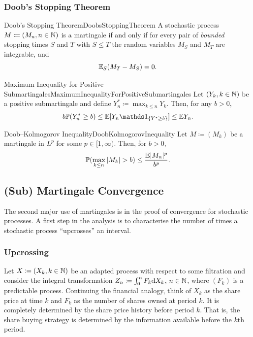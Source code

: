 \subsubsection{Doob's Stopping Theorem}
\begin{thm}{Doob's Stopping Theorem}{DoobsStoppingTheorem}
	A stochastic process $M \coloneqq (M_n, n \in \mathbb{N})$ is a martingale if and only if for every pair of \emph{bounded} stopping times $S$ and $T$ with $S \le T$ the random variables $M_S$ and $M_T$ are integrable, and
	\begin{equation}\label{eq:DoobsStoppingEquality}
		\mathbb{E}_S(M_T - M_S) = 0.
	\end{equation}
\end{thm}

\begin{lem}{Maximum Inequality for Positive Submartingales}{MaximumInequalityForPositiveSubmartingales}
	Let $(Y_k, k \in \mathbb{N})$ be a positive submartingale and define $Y_n^* \coloneqq \max_{k \le n} Y_k$. Then, for any $b > 0$,
	\begin{equation}\label{eq:MaxInequalityPositiveSub}
		b \Pm(Y_n^* \ge b) \le \E[Y_n \I_{\{Y^* \ge b\}}] \le \E Y_n.
	\end{equation}
\end{lem}

\begin{thm}{Doob--Kolmogorov Inequality}{DoobKolmogorovInequality}
	Let $M \coloneqq (M_k)$ be a martingale in $L^p$ for some $p \in [1, \infty)$. Then, for $b > 0$,
	\begin{equation}\label{eq:DoobKolmogorovInequality}
		\mathbb{P}(\max_{k \le n} |M_k| > b) \le \frac{\mathbb{E}|M_n|^p}{b^p}.
	\end{equation}
\end{thm}

\subsection{(Sub) Martingale Convergence}
The second major use of martingales is in the proof of convergence for stochastic processes. A first step  in the analysis is to characterise the number of times
a stochastic process “upcrosses” an interval.

\subsubsection{Upcrossing}

Let $X \coloneqq (X_k, k \in \mathbb{N})$ be an adapted process with respect to some filtration and consider the integral transformation $Z_n \coloneqq \int_0^n F_k \mathrm{d} X_k$, $n \in \mathbb{N}$, where $(F_k)$ is a predictable process. Continuing the financial analogy, think of $X_k$ as the share price at time $k$ and $F_k$ as the number of shares owned at period $k$. It is completely determined by the share price history before period $k$. That is, the share buying strategy is determined by the information available before the $k$th period.

